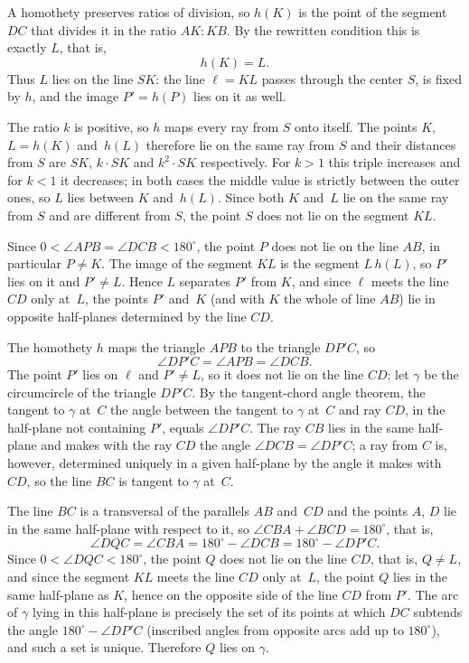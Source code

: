 {    A homothety preserves ratios of division, so $h(K)$ is the point of the segment $DC$ that divides it in the ratio $AK : KB$. By the rewritten condition this is exactly $L$, that is,
    $$
    h(K) = L.
    $$
    Thus $L$ lies on the line $SK$: the line $\ell = KL$ passes through the center $S$, is fixed by $h$, and the image $P' = h(P)$ lies on it as well.

    The ratio $k$ is positive, so $h$ maps every ray from $S$ onto itself. The points $K$, $L = h(K)$ and~$h(L)$ therefore lie on the same ray from $S$ and their distances from $S$ are $SK$, $k \cdot SK$ and $k^2 \cdot SK$ respectively. For $k > 1$ this triple increases and for $k < 1$ it decreases; in both cases the middle value is strictly between the outer ones, so $L$ lies between $K$ and~$h(L)$. Since both $K$ and~$L$ lie on the same ray from $S$ and are different from $S$, the point $S$ does not lie on the segment $KL$.

    Since $0 < \angle APB = \angle DCB < 180^\circ$, the point $P$ does not lie on the line $AB$, in particular $P \neq K$. The image of the segment $KL$ is the segment $L\,h(L)$, so $P'$ lies on it and $P' \neq L$. Hence $L$ separates $P'$ from $K$, and since $\ell$ meets the line $CD$ only at~$L$, the points $P'$ and~$K$ (and with $K$ the whole of line $AB$) lie in opposite half-planes determined by the line $CD$.

    The homothety $h$ maps the triangle $APB$ to the triangle $DP'C$, so
    $$
    \angle DP'C = \angle APB = \angle DCB.
    $$
    The point $P'$ lies on $\ell$ and $P' \neq L$, so it does not lie on the line $CD$; let $\gamma$ be the circumcircle of the triangle $DP'C$. By the tangent-chord angle theorem, the tangent to $\gamma$ at~$C$ the angle between the tangent to $\gamma$ at~$C$ and ray $CD$, in the half-plane not containing $P'$, equals $\angle DP'C$. The ray $CB$ lies in the same half-plane and makes with the ray $CD$ the angle $\angle DCB = \angle DP'C$; a ray from $C$ is, however, determined uniquely in a given half-plane by the angle it makes with~$CD$, so the line $BC$ is tangent to $\gamma$ at~$C$.

    The line $BC$ is a transversal of the parallels $AB$ and~$CD$ and the points $A$, $D$ lie in the same half-plane with respect to it, so $\angle CBA + \angle BCD = 180^\circ$, that is,
    $$
    \angle DQC = \angle CBA = 180^\circ - \angle DCB = 180^\circ - \angle DP'C.
    $$
    Since $0 < \angle DQC < 180^\circ$, the point $Q$ does not lie on the line $CD$, that is, $Q \neq L$, and since the segment $KL$ meets the line $CD$ only at~$L$, the point $Q$ lies in the same half-plane as $K$, hence on the opposite side of the line $CD$ from $P'$. The arc of $\gamma$ lying in this half-plane is precisely the set of its points at which $DC$ subtends the angle $180^\circ - \angle DP'C$ (inscribed angles from opposite arcs add up to $180^\circ$), and such a set is unique. Therefore $Q$ lies on $\gamma$.

}
